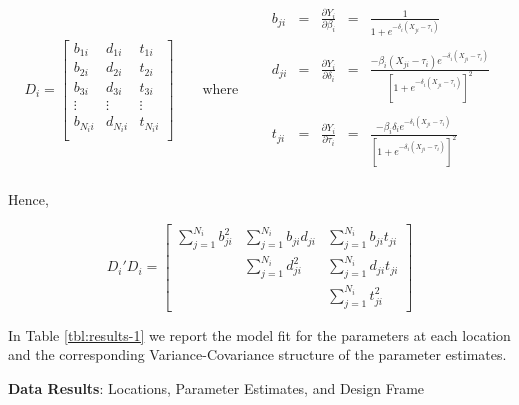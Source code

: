 \documentclass[useAMS]{cJAS2e}
\begin{document}
\begin{equation}\label{eqn:defineD}
	D_i = \left[ \begin{array}{ccc} b_{1i} & d_{1i} & t_{1i} \\ b_{2i} & d_{2i} & t_{2i} \\ b_{3i} & d_{3i} & t_{3i} \\ \vdots & \vdots & \vdots \\ b_{{N_i}i} & d_{{N_i}i} & t_{{N_i}i} \\  \end{array} \right] \qquad \text{where} \qquad
	\begin{array}{ccccc}	b_{ji} &=& \frac{\partial Y_i}{\partial \beta_i}	&=& \frac{1}{1+e^{- \delta_i(X_{ji}-\tau_i)}} \\  \\	 d_{ji} &=& \frac{\partial Y_i}{\partial \delta_i}	&=& \frac{- \beta_i(X_{ji}-\tau_i) e^{- \delta_i(X_{ji}-\tau_i)}}{ \left[1+e^{- \delta_i(X_{ji}-\tau_i)} \right]^2 } \\  \\	t_{ji} &=& \frac{\partial Y_i}{\partial \tau_i}	&=& \frac{- \beta_i \delta_i e^{- \delta_i(X_{ji}-\tau_i)}}{ \left[1+e^{- \delta_i(X_{ji}-\tau_i)} \right]^2 } \\ \end{array}
\end{equation}


Hence,

\begin{equation}\label{eqn:defineDD}
	D_i'D_i = \left[ \begin{array}{ccc} \sum_{j=1}^{N_i} b_{ji}^2 & \sum_{j=1}^{N_i} b_{ji}d_{ji} & \sum_{j=1}^{N_i} b_{ji}t_{ji} \\  & \sum_{j=1}^{N_i} d_{ji}^2 & \sum_{j=1}^{N_i} d_{ji}t_{ji} \\   &   & \sum_{j=1}^{N_i} t_{ji}^2  \end{array} \right]
\end{equation}


\noindent  In Table \ref{tbl:results-1} we report the model fit for the parameters at each location and the corresponding Variance-Covariance structure of the parameter estimates.

\newpage
\begin{landscape}
	\begin{table}[h!]
	  \begin{center}
	    \scalebox{0.70}{	 }
	  \end{center}
		\caption{\textbf{Data Results}:  Locations, Parameter Estimates, and Design Frame}
		\label{tbl:results-1}
	\end{table}
\end{landscape}
\end{document}
